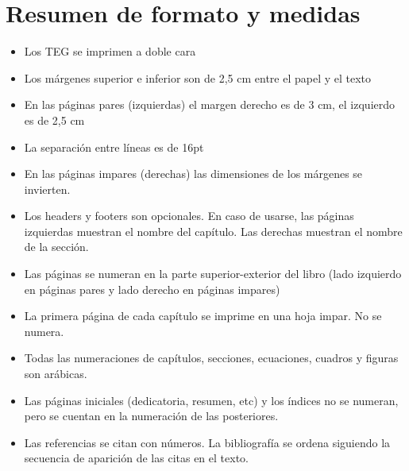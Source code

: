 \chapter{Resumen de formato y medidas}
\begin{itemize}
\item Los TEG se imprimen a doble cara 
\item Los márgenes superior e inferior son de 2,5 cm entre el papel y el texto 
\item En las páginas pares (izquierdas) el margen derecho es de 3 cm, el izquierdo es de 2,5 cm
\item La separaci\'on entre l\'ineas es de 16pt 
\item En las páginas impares (derechas) las dimensiones de los márgenes se invierten.
\item Los headers y footers son opcionales. En caso de usarse, las páginas izquierdas muestran el nombre del capítulo. Las derechas muestran el nombre de la sección.
\item Las páginas se numeran en la parte superior-exterior del libro (lado izquierdo en páginas pares y lado derecho en páginas impares)
\item La primera página de cada capítulo se imprime en una hoja impar. No se numera.
\item Todas las numeraciones de capítulos, secciones, ecuaciones, cuadros y figuras son arábicas. 
\item Las páginas iniciales (dedicatoria, resumen, etc) y los índices no se numeran, pero se cuentan en la numeración de las posteriores.
\item Las referencias se citan con números. La bibliografía se ordena siguiendo la secuencia de aparición de las citas en el texto.
\end{itemize}
%
\cleardoublepage
\thispagestyle{empty}
\AddToShipoutPicture*{\BackgroundPic}
